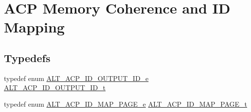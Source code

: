 \hypertarget{group__ADDR__SPACE__MGR__MEM__COHERENCE}{}\section{A\+CP Memory Coherence and ID Mapping}
\label{group__ADDR__SPACE__MGR__MEM__COHERENCE}
\subsection*{Typedefs}
\begin{DoxyCompactItemize}
\item 
typedef enum \mbox{\hyperlink{group__ADDR__SPACE__MGR__MEM__COHERENCE_ga4f1a98efabe5d8fcfcddf0e2da731d0a}{A\+L\+T\+\_\+\+A\+C\+P\+\_\+\+I\+D\+\_\+\+O\+U\+T\+P\+U\+T\+\_\+\+I\+D\+\_\+e}} \mbox{\hyperlink{group__ADDR__SPACE__MGR__MEM__COHERENCE_gac7e726302b3a38141a36cf97a4ef4f89}{A\+L\+T\+\_\+\+A\+C\+P\+\_\+\+I\+D\+\_\+\+O\+U\+T\+P\+U\+T\+\_\+\+I\+D\+\_\+t}}
\item 
typedef enum \mbox{\hyperlink{group__ADDR__SPACE__MGR__MEM__COHERENCE_gadd781c359099569d3053f323121d3dd0}{A\+L\+T\+\_\+\+A\+C\+P\+\_\+\+I\+D\+\_\+\+M\+A\+P\+\_\+\+P\+A\+G\+E\+\_\+e}} \mbox{\hyperlink{group__ADDR__SPACE__MGR__MEM__COHERENCE_ga76f004ab7bdcd5ccff68cf02fb9e5f5d}{A\+L\+T\+\_\+\+A\+C\+P\+\_\+\+I\+D\+\_\+\+M\+A\+P\+\_\+\+P\+A\+G\+E\+\_\+t}}
\end{DoxyCompactItemize}
